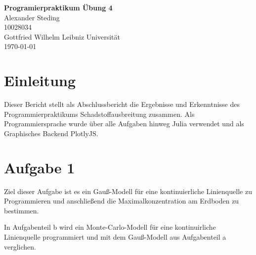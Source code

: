 \documentclass[ngerman]{scrartcl}
\newcommand{\authA}{Alexander Steding}
\begin{document}



\begin{titlepage}
\begin{center}
\vspace{3cm}
{\fontsize{40}{49} \selectfont \textbf{Programierpraktikum Übung 4}}\\[2cm]
\Large{\authA }\\
\Large{10028034 }\\
\large{Gottfried Wilhelm Leibniz Universität\\{\today}}
\end{center}
\end{titlepage}

\newpage
\tableofcontents
\newpage
\section{Einleitung }
Dieser Bericht stellt als Abschlussbericht die Ergebnisse und Erkenntnisse des Programmierpraktikums Schadstoffausbreitung zusammen. Als Programmiersprache wurde über alle Aufgaben hinweg Julia verwendet und als Graphisches Backend PlotlyJS.
\section{Aufgabe  1}
Ziel dieser Aufgabe ist es ein Gauß-Modell für eine kontinuierliche Linienquelle zu Programmieren und anschließend die Maximalkonzentration am Erdboden zu bestimmen.

In Aufgabenteil b wird ein Monte-Carlo-Modell für eine kontinuirliche Linienquelle programmiert und mit dem Gauß-Modell aus Aufgabenteil a verglichen.
\end{document}
